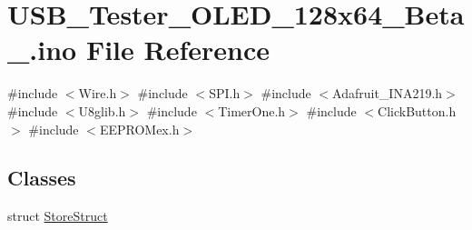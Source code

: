 \hypertarget{_u_s_b___tester___o_l_e_d__128x64___beta__2_82_8ino}{}\section{U\+S\+B\+\_\+\+Tester\+\_\+\+O\+L\+E\+D\+\_\+128x64\+\_\+\+Beta\+\_.ino File Reference}
\label{_u_s_b___tester___o_l_e_d__128x64___beta__2_82_8ino}
{\ttfamily \#include $<$Wire.\+h$>$}\newline
{\ttfamily \#include $<$S\+P\+I.\+h$>$}\newline
{\ttfamily \#include $<$Adafruit\+\_\+\+I\+N\+A219.\+h$>$}\newline
{\ttfamily \#include $<$U8glib.\+h$>$}\newline
{\ttfamily \#include $<$Timer\+One.\+h$>$}\newline
{\ttfamily \#include $<$Click\+Button.\+h$>$}\newline
{\ttfamily \#include $<$E\+E\+P\+R\+O\+Mex.\+h$>$}\newline
\subsection*{Classes}
\begin{DoxyCompactItemize}
\item 
struct \hyperlink{struct_store_struct}{Store\+Struct}
\end{DoxyCompactItemize}
